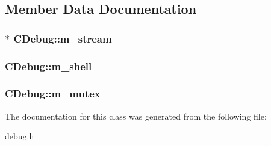 \subsection{Member Data Documentation}
\hypertarget{class_c_debug_ab0e3c0c44f27c27a9fafa30866854cbe}{
\subsubsection[{m\-\_\-stream}]{$\ast$ C\-Debug\-::m\-\_\-stream\hspace{0.3cm}{\ttfamily [protected]}}}\label{class_c_debug_ab0e3c0c44f27c27a9fafa30866854cbe}
\hypertarget{class_c_debug_a1e4ada8bb77d3cbcfaf614f0a657d6c7}{
\subsubsection[{m\-\_\-shell}]{ C\-Debug\-::m\-\_\-shell\hspace{0.3cm}{\ttfamily [protected]}}}\label{class_c_debug_a1e4ada8bb77d3cbcfaf614f0a657d6c7}
\hypertarget{class_c_debug_a5c8a50a383cc0f5ddd26efb72d6b4794}{
\subsubsection[{m\-\_\-mutex}]{ C\-Debug\-::m\-\_\-mutex\hspace{0.3cm}{\ttfamily [protected]}}}\label{class_c_debug_a5c8a50a383cc0f5ddd26efb72d6b4794}


The documentation for this class was generated from the following file\-:\begin{DoxyCompactItemize}
\item 
debug.\-h\end{DoxyCompactItemize}
